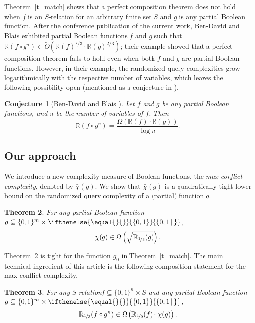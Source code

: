 \documentclass[11pt]{article}
\numberwithin{equation}{section}
\newtheorem{theorem}{Theorem}[section]
\newtheorem{conjecture}[theorem]{Conjecture}
\theoremstyle{definition}
\theoremstyle{plain}
\newcommand{\R}{\mathbb R}
\newcommand{\expref}[2]{\hyperref[#2]{#1~\ref{#2}}}
\newcommand{\relation}{$S$-relation\xspace}     %
\newcommand{\md}{\middle}
\newcommand{\dr}{\nicefrac}
\newcommand{\set}[2][]{\ifthenelse{\equal{}{#1}}%
{\ensuremath{\left\{#2\right\}}}%
{\ensuremath{\left\{#2\,\md|\,#1\right\}}}}
\newcommand{\OI}{\set{0,1}}
\newcommand{\ccc}{max-conflict complexity}
\begin{document}
\expref{Theorem}{t_match} shows that a perfect composition theorem does not hold when $f$ is an  %
%
%
%
\relation for an arbitrary finite set $S$ and $g$ is any partial %
Boolean  %
function. After the conference publication of the current work, Ben-David and Blais \cite{DBLP:journals/corr/abs-2002-10809} %
exhibited partial Boolean functions $f$ and $g$ such that
%
$\R(f \circ g^n) \in \widetilde{O}(\R(f)^{2/3}\cdot \R(g)^{2/3})$; their example showed that a perfect composition theorem fails to hold even when both $f$ and $g$ are partial Boolean functions. However, in their example, the randomized query complexities grow logarithmically with the respective number of variables, which leaves the following possibility open (mentioned as a conjecture in \cite{DBLP:journals/corr/abs-2002-10809}).
\begin{conjecture}[Ben-David and Blais \cite{DBLP:journals/corr/abs-2002-10809}]
Let $f$ and $g$ be any partial Boolean functions, and $n$ be the 
number of variables of $f$.  Then  
\[\R(f \circ g^n)=\frac{\Omega(\R(f)\cdot \R(g))}{\log n}.\]
\end{conjecture}

%
\subsection{Our approach} %

We introduce a new complexity measure of Boolean functions, the \emph{\ccc}, denoted by $\bar \chi(g)$.
We show that $\bar \chi(g)$ is a quadratically tight lower bound on
the  %
randomized query complexity of a (partial) function $g$.

\begin{theorem}
\label{thm:maxquad}
For any partial Boolean function
%
$g\subseteq \{0,1\}^m \times \OI$,
\[\bar \chi(g)\in\Omega\left(\sqrt{\R_{\dr13}(g)}\right).\]
\end{theorem}

\expref{Theorem}{thm:maxquad} is tight for the function $g_0$ in \expref{Theorem}{t_match}. The main technical ingredient of this 
%
%
article  %
is the following composition statement for the \ccc.

\begin{theorem}
\label{main}
For any \relation $f \subseteq \{0,1\}^n \times S$ and any partial Boolean function
%
$g\subseteq \{0,1\}^m \times \OI$,
\[\R_{\dr13}(f \circ g^n) \in \Omega\left(\R_{\dr49}(f) \cdot \bar \chi(g)\right).\]
\end{theorem}
\end{document}
